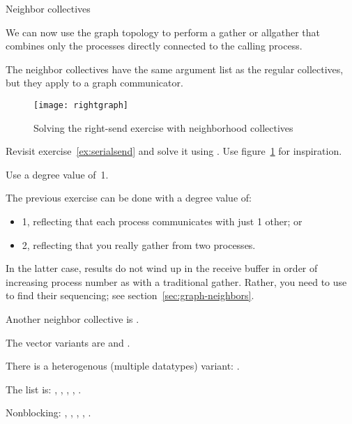  {Neighbor collectives}
\label{sec:mpi-neigh-coll}

We can now use the graph topology to perform a gather or allgather
that combines only the processes directly connected to the calling
process.

The neighbor collectives have the same argument list as the regular
collectives, but they apply to a graph communicator.

\begin{figure}[ht]
  \texttt{[image: rightgraph]}
  \caption{Solving the right-send exercise with neighborhood
    collectives}
  \label{fig:rightgraph}
\end{figure}

\begin{exercise}
  \label{ex:rightgraph}
  Revisit exercise~\ref{ex:serialsend} and solve it using
  .
  Use figure~\ref{fig:rightgraph} for inspiration.

  Use a degree value of~1.
\end{exercise}

The previous exercise can be done with a degree value of:
\begin{itemize}
\item 1, reflecting that each process communicates with just 1 other; or
\item 2, reflecting that you really gather from two processes.
\end{itemize}
In the latter case, results do not wind up in the receive buffer
in order of increasing process number as with a traditional gather.
Rather, you need to use~
to find their sequencing; see section~\ref{sec:graph-neighbors}.

Another neighbor collective is .

The vector variants are
and
.

There is a heterogenous (multiple datatypes) variant:
.

The list is: ,
,
,
,
.

Nonblocking:
,
,
,
,
.

